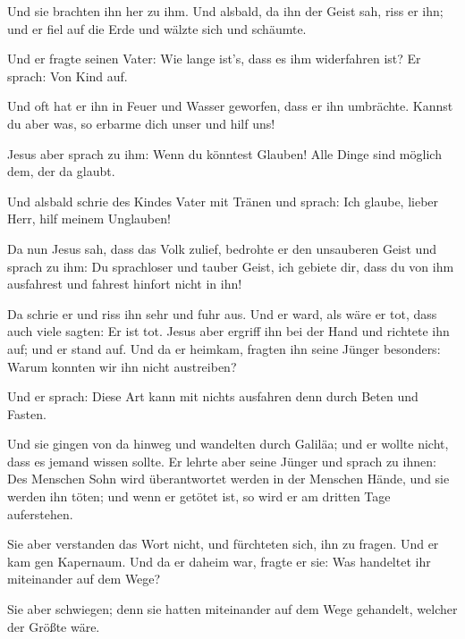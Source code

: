  Und sie brachten ihn her zu ihm. Und alsbald, da ihn der
Geist sah, riss er ihn; und er fiel auf die Erde und wälzte sich und
schäumte.

 Und er fragte seinen Vater: Wie lange ist's, dass es ihm
widerfahren ist? Er sprach: Von Kind auf.

 Und oft hat er ihn in Feuer und Wasser geworfen, dass er
ihn umbrächte. Kannst du aber was, so erbarme dich unser und hilf uns!

 Jesus aber sprach zu ihm: Wenn du könntest Glauben! Alle
Dinge sind möglich dem, der da glaubt.

 Und alsbald schrie des Kindes Vater mit Tränen und
sprach: Ich glaube, lieber Herr, hilf meinem Unglauben!

 Da nun Jesus sah, dass das Volk zulief, bedrohte er den
unsauberen Geist und sprach zu ihm: Du sprachloser und tauber Geist, ich
gebiete dir, dass du von ihm ausfahrest und fahrest hinfort nicht in
ihn!

 Da schrie er und riss ihn sehr und fuhr aus. Und er
ward, als wäre er tot, dass auch viele sagten: Er ist tot.
 Jesus aber ergriff ihn bei der Hand und richtete ihn
auf; und er stand auf.  Und da er heimkam, fragten ihn
seine Jünger besonders: Warum konnten wir ihn nicht austreiben?

 Und er sprach: Diese Art kann mit nichts ausfahren denn
durch Beten und Fasten.

 Und sie gingen von da hinweg und wandelten durch
Galiläa; und er wollte nicht, dass es jemand wissen sollte.
 Er lehrte aber seine Jünger und sprach zu ihnen: Des
Menschen Sohn wird überantwortet werden in der Menschen Hände, und sie
werden ihn töten; und wenn er getötet ist, so wird er am dritten Tage
auferstehen.

 Sie aber verstanden das Wort nicht, und fürchteten sich,
ihn zu fragen.  Und er kam gen Kapernaum. Und da er
daheim war, fragte er sie: Was handeltet ihr miteinander auf dem Wege?

 Sie aber schwiegen; denn sie hatten miteinander auf dem
Wege gehandelt, welcher der Größte wäre.

